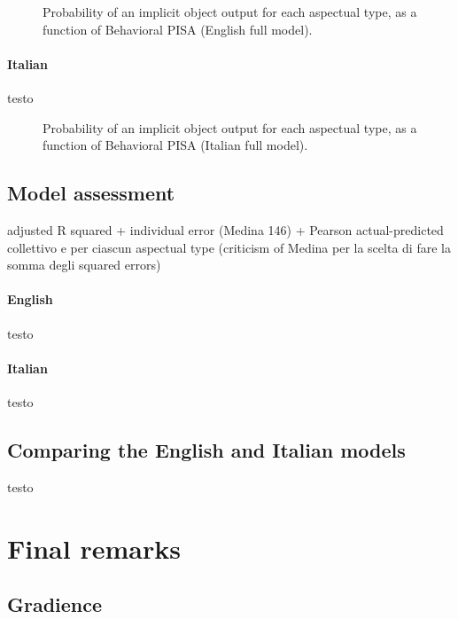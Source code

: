 \begin{figure}[htb]
\caption{Probability of an implicit object output for each aspectual type, as a function of Behavioral PISA (English full model).}
    
\end{figure}

\paragraph{Italian} testo

\begin{figure}[htb]
\caption{Probability of an implicit object output for each aspectual type, as a function of Behavioral PISA (Italian full model).}
    
\end{figure}


\subsection{Model assessment} 

adjusted R squared + 
individual error (Medina 146) +
Pearson actual-predicted collettivo e per ciascun aspectual type
(criticism of Medina per la scelta di fare la somma degli squared errors)

\paragraph{English} testo

\paragraph{Italian} testo


\subsection{Comparing the English and Italian models} 

testo



\section{Final remarks} 


\subsection{Gradience} 

